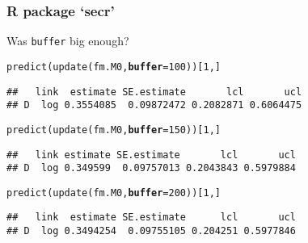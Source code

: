 \documentclass[color=usenames,dvipsnames]{beamer}\usepackage[]{graphicx}\usepackage[]{xcolor}
\makeatletter
\newcommand{\hlnum}[1]{\textcolor[rgb]{0.69,0.494,0}{#1}}%
\newcommand{\hldef}[1]{\textcolor[rgb]{0,0,0}{#1}}%
\newcommand{\hlkwc}[1]{\textcolor[rgb]{0,0,0}{\textbf{#1}}}%
\newcommand{\hlkwd}[1]{\textcolor[rgb]{0.004,0.004,0.506}{#1}}%
\newenvironment{kframe}{%
 \def\at@end@of@kframe{}%
 \ifinner\ifhmode%
  \def\at@end@of@kframe{\end{minipage}}%
  \begin{minipage}{\columnwidth}%
 \fi\fi%
 \def\FrameCommand##1{\hskip\@totalleftmargin \hskip-\fboxsep
 \colorbox{shadecolor}{##1}\hskip-\fboxsep
     \hskip-\linewidth \hskip-\@totalleftmargin \hskip\columnwidth}%
 \MakeFramed {\advance\hsize-\width
   \@totalleftmargin\z@ \linewidth\hsize
   \@setminipage}}%
 {\par\unskip\endMakeFramed%
 \at@end@of@kframe}
\newenvironment{knitrout}{}{} %
\let\hlstd\hldef
\newcommand{\inr}[1]{\colorbox{inlinecolor}{\texttt{#1}}}
\makeatother
\begin{document}
\begin{frame}[fragile]
  \frametitle{R package `secr'}
  \small
  Was \inr{buffer} big enough?
\begin{knitrout}\scriptsize
{}\color{fgcolor}\begin{kframe}
\begin{alltt}
\hlkwd{predict}\hlstd{(}\hlkwd{update}\hlstd{(fm.M0,} \hlkwc{buffer}\hlstd{=}\hlnum{100}\hlstd{))[}\hlnum{1}\hlstd{,]}
\end{alltt}
\begin{verbatim}
##   link  estimate SE.estimate       lcl       ucl
## D  log 0.3554085  0.09872472 0.2082871 0.6064475
\end{verbatim}
\end{kframe}
\end{knitrout}
\pause
\vspace{-12pt}
\begin{knitrout}\scriptsize
{}\color{fgcolor}\begin{kframe}
\begin{alltt}
\hlkwd{predict}\hlstd{(}\hlkwd{update}\hlstd{(fm.M0,} \hlkwc{buffer}\hlstd{=}\hlnum{150}\hlstd{))[}\hlnum{1}\hlstd{,]}
\end{alltt}
\begin{verbatim}
##   link estimate SE.estimate       lcl       ucl
## D  log 0.349599  0.09757013 0.2043843 0.5979884
\end{verbatim}
\end{kframe}
\end{knitrout}
\pause
\vspace{-12pt}
\begin{knitrout}\scriptsize
{}\color{fgcolor}\begin{kframe}
\begin{alltt}
\hlkwd{predict}\hlstd{(}\hlkwd{update}\hlstd{(fm.M0,} \hlkwc{buffer}\hlstd{=}\hlnum{200}\hlstd{))[}\hlnum{1}\hlstd{,]}
\end{alltt}
\begin{verbatim}
##   link  estimate SE.estimate      lcl       ucl
## D  log 0.3494254  0.09755105 0.204251 0.5977846
\end{verbatim}
\end{kframe}
\end{knitrout}
\pause
\vspace{-12pt}
\begin{knitrout}\scriptsize
{}\color{fgcolor}\begin{kframe}

\end{kframe}
\end{knitrout}
\end{frame}
\end{document}
